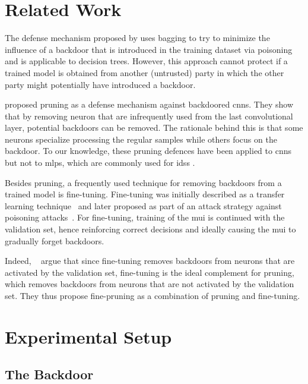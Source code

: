 \documentclass[10pt,sigconf,letterpaper,dvipsnames]{acmart}
\begin{document}
\section{Related Work}

The defense mechanism proposed by \cite{biggio_bagging_2011} uses bagging to try to minimize the influence of a backdoor that is introduced in the training dataset via poisoning and is applicable to decision trees. However, this approach cannot protect if a trained model is obtained from another (untrusted) party in which the other party might potentially have introduced a backdoor. 

\cite{gu_badnets:_2017} proposed pruning as a defense mechanism against backdoored \glspl{cnn}. They show that by removing neuron that are infrequently used from the last convolutional layer, potential backdoors can be removed. The rationale behind this is that some neurons specialize processing the regular samples while others focus on the backdoor. To our knowledge, these pruning defences have been applied to \glspl{cnn} but not to \glspl{mlp}, which are commonly used for \glspl{ids} \cite{meghdouri_analysis_2018}.

Besides pruning, a frequently used technique for removing backdoors from a trained model is fine-tuning. Fine-tuning was initially described as a transfer learning technique~\cite{yosinski_how_2014} and later proposed as part of an attack strategy against poisoning attacks~\cite{liu_fine-pruning:_2018}. For fine-tuning, training of the \gls{mui} is continued with the validation set, hence reinforcing correct decisions and ideally causing the \gls{mui} to gradually forget backdoors.

Indeed, \citeauthor{liu_fine-pruning:_2018}~\cite{liu_fine-pruning:_2018} argue that since fine-tuning removes backdoors from neurons that are activated by the validation set, fine-tuning is the ideal complement for pruning, which removes backdoors from neurons that are not activated by the validation set. They thus propose fine-pruning as a combination of pruning and fine-tuning.

\section{Experimental Setup} \label{sec:ml_approaches}
\subsection{The Backdoor}
\end{document}
